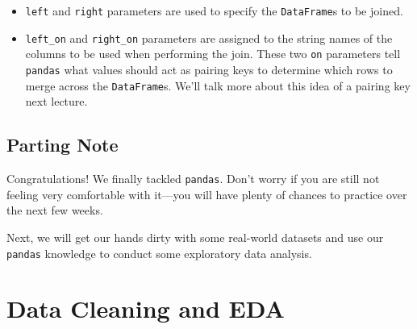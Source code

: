 \documentclass[
  letterpaper,
  DIV=11,
  numbers=noendperiod]{scrreprt}
\providecommand{\tightlist}{%
  \setlength{\itemsep}{0pt}\setlength{\parskip}{0pt}}\usepackage{longtable,booktabs,array}
\begin{document}
\begin{itemize}
\tightlist
\item
  \texttt{left} and \texttt{right} parameters are used to specify the
  \texttt{DataFrame}s to be joined.
\item
  \texttt{left\_on} and \texttt{right\_on} parameters are assigned to
  the string names of the columns to be used when performing the join.
  These two \texttt{on} parameters tell \texttt{pandas} what values
  should act as pairing keys to determine which rows to merge across the
  \texttt{DataFrame}s. We'll talk more about this idea of a pairing key
  next lecture.
\end{itemize}

\section{Parting Note}\label{parting-note-2}

Congratulations! We finally tackled \texttt{pandas}. Don't worry if you
are still not feeling very comfortable with it---you will have plenty of
chances to practice over the next few weeks.

Next, we will get our hands dirty with some real-world datasets and use
our \texttt{pandas} knowledge to conduct some exploratory data analysis.


\chapter{Data Cleaning and EDA}\label{data-cleaning-and-eda}
\end{document}
